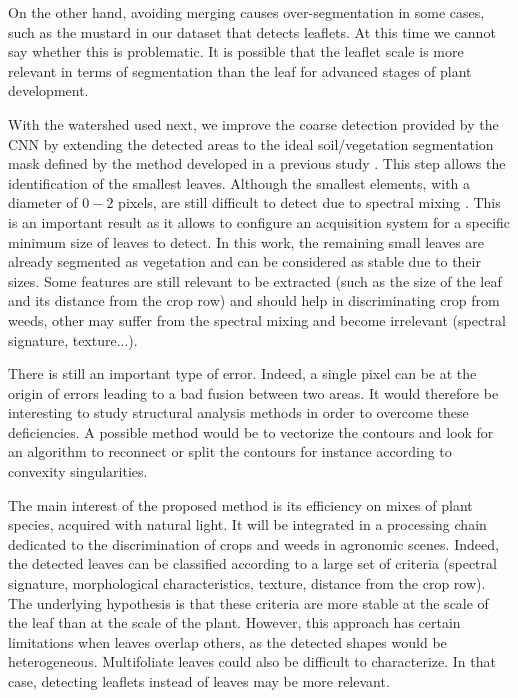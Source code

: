 \documentclass[../thesis.tex]{subfiles}
\begin{document}
    \newpage
    On the other hand, avoiding merging causes over-segmentation in some cases, such as the mustard in our dataset that detects leaflets. At this time we cannot say whether this is problematic. It is possible that the leaflet scale is more relevant in terms of segmentation than the leaf for advanced stages of plant development.
    
    With the watershed used next, we improve the coarse detection provided by the CNN by extending the detected areas to the ideal soil/vegetation segmentation mask defined by the method developed in a previous study \cite{Vayssade2021}. This step allows the identification of the smallest leaves. Although the smallest elements, with a diameter of $0-2$ pixels, are still difficult to detect due to spectral mixing \cite{Louargant2017}. This is an important result as it allows to configure an acquisition system for a specific minimum size of leaves to detect. In this work, the remaining small leaves are already segmented as vegetation and can be considered as stable due to their sizes. Some features are still relevant to be extracted (such as the size of the leaf and its distance from the crop row) and should help in discriminating crop from weeds, other may suffer from the spectral mixing and become irrelevant (spectral signature, texture...).
    
    There is still an important type of error. Indeed, a single pixel can be at the origin of errors leading to a bad fusion between two areas. It would therefore be interesting to study structural analysis methods in order to overcome these deficiencies. A possible method would be to vectorize the contours and look for an algorithm to reconnect or split the contours for instance according to convexity singularities.
    
    The main interest of the proposed method is its efficiency on mixes of plant species, acquired with natural light. It will be integrated in a processing chain dedicated to the discrimination of crops and weeds in agronomic scenes. Indeed, the detected leaves can be classified according to a large set of criteria (spectral signature, morphological characteristics, texture, distance from the crop row). The underlying hypothesis is that these criteria are more stable at the scale of the leaf than at the scale of the plant. However, this approach has certain limitations when leaves overlap others, as the detected shapes would be heterogeneous. Multifoliate leaves could also be difficult to characterize. In that case, detecting leaflets instead of leaves may be more relevant. 
    
\end{document}
